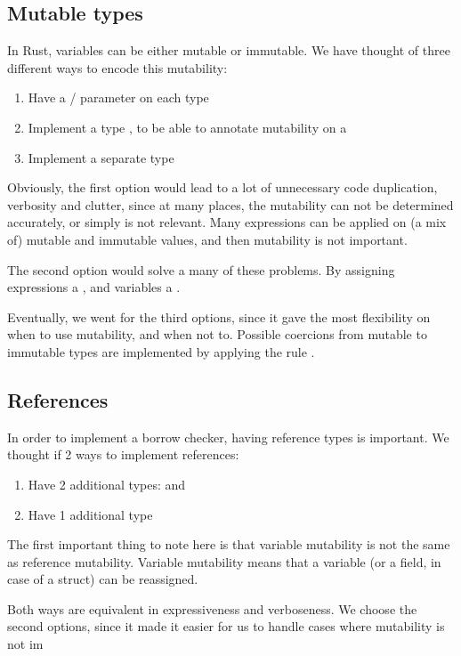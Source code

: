 \subsection{Mutable types}

In Rust, variables can be either mutable or immutable. We have thought of three different ways to encode this mutability:
\begin{enumerate}
    \item Have a / parameter on each type
    \item Implement a type , to be able to annotate mutability on a 
    \item Implement a separate type 
\end{enumerate}

Obviously, the first option would lead to a lot of unnecessary code duplication, verbosity and clutter, since at many places, the mutability can not be determined accurately, or simply is not relevant. Many expressions can be applied on (a mix of) mutable and immutable values, and then mutability is not important.

The second option would solve a many of these problems. By assigning expressions a , and variables a . 

Eventually, we went for the third options, since it gave the most flexibility on when to use mutability, and when not to. Possible coercions from mutable to immutable types are implemented by applying the rule .

\subsection{References}

In order to implement a borrow checker, having reference types is important. We thought if 2 ways to implement references:
\begin{enumerate}
    \item Have 2 additional types:  and 
    \item Have 1 additional type 
\end{enumerate}

The first important thing to note here is that variable mutability is not the same as reference mutability. Variable mutability means that a variable (or a field, in case of a struct) can be reassigned.

Both ways are equivalent in expressiveness and verboseness. We choose the second options, since it made it easier for us to handle cases where mutability is not im